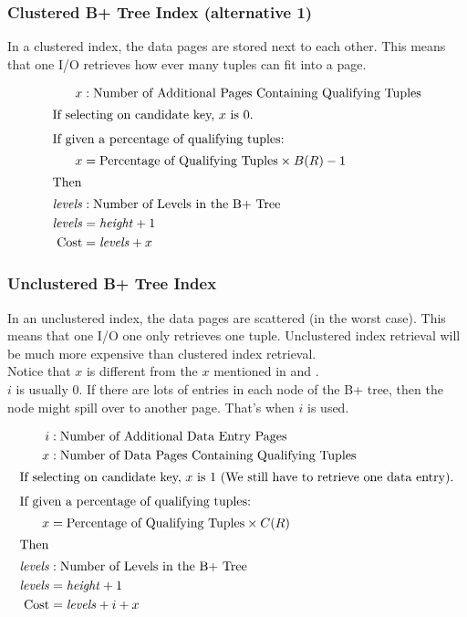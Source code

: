 \documentclass{article}
\begin{document}
\subsubsection{Clustered B+ Tree Index (alternative 1)}
\label{sec:clustered-b+-tree}

In a clustered index, the data pages are stored next to each
other. This means that one I/O retrieves how ever many tuples can fit
into a page.

\begin{align}
  x &: \text{Number of Additional Pages Containing Qualifying Tuples} \notag \\
  \intertext{If selecting on candidate key, \(x\) is 0.}
  \intertext{If given a percentage of qualifying tuples:}
  x &= \text{Percentage of Qualifying Tuples} \times B(R) - 1 \\
  \intertext{Then}
  \mathit{levels} &: \text{Number of Levels in the B+ Tree} \notag \\
  \mathit{levels} &= \mathit{height} + 1 \\
  \text{Cost} &= \mathit{levels} + x
\end{align}

\subsubsection{Unclustered B+ Tree Index}

In an unclustered index, the data pages are scattered (in the worst
case). This means that one I/O one only retrieves one
tuple. Unclustered index retrieval will be much more expensive than
clustered index retrieval. \\

Notice that \(x\) is different from the \(x\) mentioned in
 and . \\

\(i\) is usually 0. If there are lots of entries in each node of the
B+ tree, then the node might spill over to another page. That's when
\(i\) is used.

\begin{align}
  i &: \text{Number of Additional Data Entry Pages} \notag \\
  x &: \text{Number of Data Pages Containing Qualifying Tuples} \notag \\
  \intertext{If selecting on candidate key, \(x\) is 1 (We still have to retrieve one data entry).}
  \intertext{If given a percentage of qualifying tuples:}
  x &= \text{Percentage of Qualifying Tuples} \times C(R) \\
  \intertext{Then}
  \mathit{levels} &: \text{Number of Levels in the B+ Tree} \notag \\
  \mathit{levels} &= \mathit{height} + 1 \\
  \text{Cost} &= \mathit{levels} + i + x
\end{align}
\end{document}
